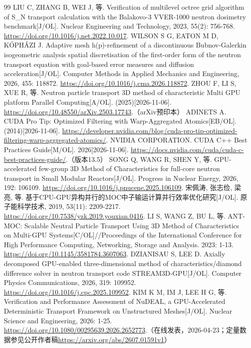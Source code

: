 \documentclass[UTF8, zihao=-4, fontset=none, a4paper]{ctexart}
\begin{document}
\begin{thebibliography}{99}
 LIU C, ZHANG B, WEI J, 等. Verification of multilevel octree grid algorithm of S\_N transport calculation with the Balakovo-3 VVER-1000 neutron dosimetry benchmark{[}J/OL{]}. Nuclear Engineering and Technology, 2023, 55(2): 756-768. \url{https://doi.org/10.1016/j.net.2022.10.017}.
 WILSON S G, EATON M D, KÓPHÁZI J. Adaptive mesh h(p)-refinement of a discontinuous Bubnov-Galerkin isogeometric analysis spatial discretisation of the first-order form of the neutron transport equation with goal-based error measures and diffusion acceleration{[}J/OL{]}. Computer Methods in Applied Mechanics and Engineering, 2026, 455: 118872. \url{https://doi.org/10.1016/j.cma.2026.118872}.
 ZHOU F, LI S, XUE R, 等. Neutron particle transport 3D method of characteristic Multi GPU platform Parallel Computing{[}A/OL{]}. (2025)[2026-11-06]. \url{https://doi.org/10.48550/arXiv.2503.17743}.（arXiv预印本）
 ADINETS A. CUDA Pro Tip: Optimized Filtering with Warp-Aggregated Atomics{[}EB/OL{]}. (2014)[2026-11-06]. \url{https://developer.nvidia.com/blog/cuda-pro-tip-optimized-filtering-warp-aggregated-atomics/}.
 NVIDIA CORPORATION. CUDA C++ Best Practices Guide{[}M/OL{]}. 2026[2026-11-06]. \url{https://docs.nvidia.com/cuda/cuda-c-best-practices-guide/}.（版本13.5）
 SONG Q, WANG R, SHEN Y, 等. GPU-accelerated few-group 3D Method of Characteristics for full-core neutron transport in Small Modular Reactors{[}J/OL{]}. Progress in Nuclear Energy, 2026, 192: 106109. \url{https://doi.org/10.1016/j.pnucene.2025.106109}.
 宋佩涛, 张志俭, 梁亮, 等. 基于CPU-GPU异构并行的MOC中子输运计算并行效率优化研究{[}J/OL{]}. 原子能科学技术, 2019, 53(11): 2209-2217. \url{https://doi.org/10.7538/yzk.2019.youxian.0416}.
 LI S, WANG Z, BU L, 等. ANT-MOC: Scalable Neutral Particle Transport Using 3D Method of Characteristics on Multi-GPU Systems{[}C/OL{]}//Proceedings of the International Conference for High Performance Computing, Networking, Storage and Analysis. 2023: 1-13. \url{https://doi.org/10.1145/3581784.3607063}.
 DZIANISAU S, LEE D. Axially decomposed GPU-enabled three-dimensional method of characteristics/diamond difference solver in neutron transport code STREAM3D-GPU{[}J/OL{]}. Computer Physics Communications, 2026, 319: 109952. \url{https://doi.org/10.1016/j.cpc.2025.109952}.
 KIM K M, IM J, LEE H G, 等. Verification and Performance Assessment of NuDEAL, a GPU-Accelerated Deterministic Transport Framework on Unstructured Meshes{[}J/OL{]}. Nuclear Science and Engineering, 2026: 1-25. \url{https://doi.org/10.1080/00295639.2026.2652773}.（在线发表，2026-04-23；定量数据参见公开作者稿\url{https://arxiv.org/abs/2607.01591v1}）

\end{thebibliography}
\end{document}
